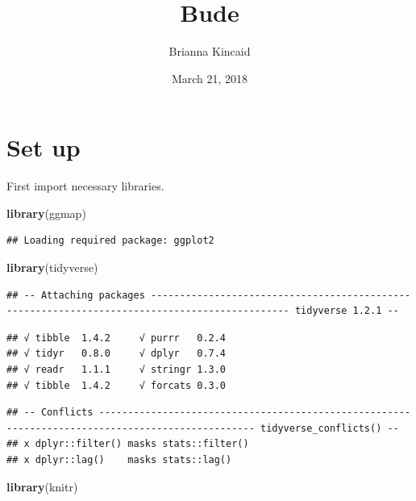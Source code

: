 \documentclass[]{article}
\title{Bude}
\author{Brianna Kincaid}
\date{March 21, 2018}
\newenvironment{Shaded}{\begin{snugshade}}{\end{snugshade}}
\newcommand{\KeywordTok}[1]{\textcolor[rgb]{0.13,0.29,0.53}{\textbf{#1}}}
\newcommand{\NormalTok}[1]{#1}
\begin{document}
\maketitle

\hypertarget{set-up}{%
\section{Set up}\label{set-up}}

First import necessary libraries.

\begin{Shaded}
\begin{Highlighting}[]
\KeywordTok{library}\NormalTok{(ggmap)}
\end{Highlighting}
\end{Shaded}

\begin{verbatim}
## Loading required package: ggplot2
\end{verbatim}

\begin{Shaded}
\begin{Highlighting}[]
\KeywordTok{library}\NormalTok{(tidyverse)}
\end{Highlighting}
\end{Shaded}

\begin{verbatim}
## -- Attaching packages ---------------------------------------------------------------------------------------------- tidyverse 1.2.1 --
\end{verbatim}

\begin{verbatim}
## √ tibble  1.4.2     √ purrr   0.2.4
## √ tidyr   0.8.0     √ dplyr   0.7.4
## √ readr   1.1.1     √ stringr 1.3.0
## √ tibble  1.4.2     √ forcats 0.3.0
\end{verbatim}

\begin{verbatim}
## -- Conflicts ------------------------------------------------------------------------------------------------- tidyverse_conflicts() --
## x dplyr::filter() masks stats::filter()
## x dplyr::lag()    masks stats::lag()
\end{verbatim}

\begin{Shaded}
\begin{Highlighting}[]
\KeywordTok{library}\NormalTok{(knitr)}
\end{Highlighting}
\end{Shaded}
\end{document}

